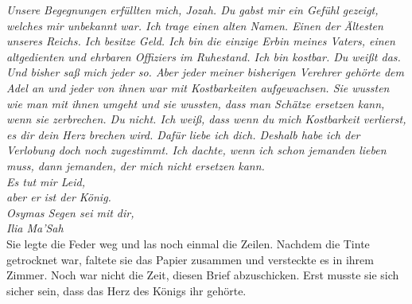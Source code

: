 \textit{Unsere Begegnungen erfüllten mich, Jozah. Du gabst mir ein Gefühl gezeigt, welches mir 
unbekannt war. Ich trage einen alten Namen. Einen der Ältesten unseres Reichs. Ich besitze Geld. 
Ich bin die einzige Erbin meines Vaters, einen altgedienten und ehrbaren Offiziers im Ruhestand. Ich 
bin kostbar. Du weißt das. Und bisher saß mich jeder so. Aber jeder meiner bisherigen Verehrer 
gehörte dem Adel an und jeder von ihnen war mit Kostbarkeiten aufgewachsen. Sie wussten wie man mit 
ihnen umgeht und sie wussten, dass man Schätze ersetzen kann, wenn sie zerbrechen. Du nicht. Ich 
weiß, dass wenn du mich Kostbarkeit verlierst, es dir dein Herz brechen wird. Dafür liebe ich dich. 
Deshalb habe ich der Verlobung doch noch zugestimmt. Ich dachte, wenn ich schon jemanden lieben 
muss, dann jemanden, der mich nicht ersetzen kann.\\}
\textit{Es tut mir Leid,}\\
\textit{aber er ist der König.}\\

\textit{Osymas Segen sei mit dir,}\\
\textit{Ilia Ma'Sah}\\

Sie legte die Feder weg und las noch einmal die Zeilen. Nachdem die Tinte getrocknet war, faltete 
sie das Papier zusammen und versteckte es in ihrem Zimmer. Noch war nicht die Zeit, diesen Brief 
abzuschicken. Erst musste sie sich sicher sein, dass das Herz des Königs ihr gehörte.
